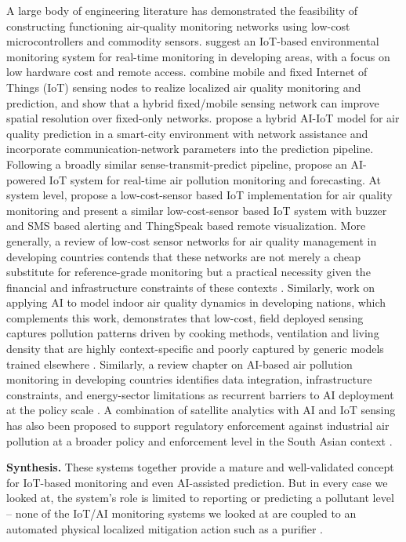 A large body of engineering literature has demonstrated the feasibility of constructing functioning air-quality monitoring networks using low-cost microcontrollers and commodity sensors. \citet{alam2025iot} suggest an IoT-based environmental monitoring system for real-time monitoring in developing areas, with a focus on low hardware cost and remote access. \citet{zhang2020realtime} combine mobile and fixed Internet of Things (IoT) sensing nodes to realize localized air quality monitoring and prediction, and show that a hybrid fixed/mobile sensing network can improve spatial resolution over fixed-only networks. \citet{kataria2022aiiot} propose a hybrid AI-IoT model for air quality prediction in a smart-city environment with network assistance and incorporate communication-network parameters into the prediction pipeline. Following a broadly similar sense-transmit-predict pipeline, \citet{mani2021aipowered} propose an AI-powered IoT system for real-time air pollution monitoring and forecasting. At system level, \citet{ramadhani2025iot} propose a low-cost-sensor based IoT implementation for air quality monitoring and \citet{pavan2025realtime} present a similar low-cost-sensor based IoT system with buzzer and SMS based alerting and ThingSpeak based remote visualization. More generally, a review of low-cost sensor networks for air quality management in developing countries contends that these networks are not merely a cheap substitute for reference-grade monitoring but a practical necessity given the financial and infrastructure constraints of these contexts \citep{shabbir2025paradigm}. Similarly, work on applying AI to model indoor air quality dynamics in developing nations, which complements this work, demonstrates that low-cost, field deployed sensing captures pollution patterns driven by cooking methods, ventilation and living density that are highly context-specific and poorly captured by generic models trained elsewhere \citep{karmakar2024exploring}. Similarly, a review chapter on AI-based air pollution monitoring in developing countries identifies data integration, infrastructure constraints, and energy-sector limitations as recurrent barriers to AI deployment at the policy scale \citep{noman2025aiair}. A combination of satellite analytics with AI and IoT sensing has also been proposed to support regulatory enforcement against industrial air pollution at a broader policy and enforcement level in the South Asian context \citep{ahmed2025smart}.

\textbf{Synthesis.} These systems together provide a mature and well-validated concept for IoT-based monitoring and even AI-assisted prediction. But in every case we looked at, the system’s role is limited to reporting or predicting a pollutant level – none of the IoT/AI monitoring systems we looked at are coupled to an automated physical localized mitigation action such as a purifier .

